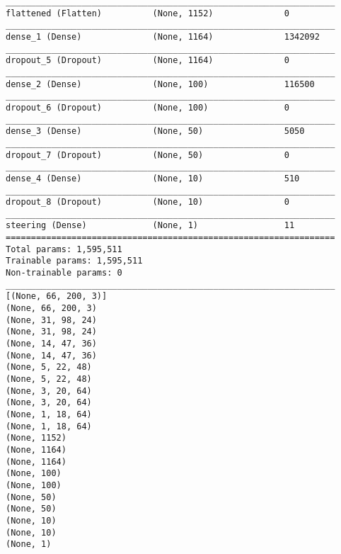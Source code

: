 \begin{verbatim}
_________________________________________________________________
flattened (Flatten)          (None, 1152)              0         
_________________________________________________________________
dense_1 (Dense)              (None, 1164)              1342092   
_________________________________________________________________
dropout_5 (Dropout)          (None, 1164)              0         
_________________________________________________________________
dense_2 (Dense)              (None, 100)               116500    
_________________________________________________________________
dropout_6 (Dropout)          (None, 100)               0         
_________________________________________________________________
dense_3 (Dense)              (None, 50)                5050      
_________________________________________________________________
dropout_7 (Dropout)          (None, 50)                0         
_________________________________________________________________
dense_4 (Dense)              (None, 10)                510       
_________________________________________________________________
dropout_8 (Dropout)          (None, 10)                0         
_________________________________________________________________
steering (Dense)             (None, 1)                 11        
=================================================================
Total params: 1,595,511
Trainable params: 1,595,511
Non-trainable params: 0
_________________________________________________________________
[(None, 66, 200, 3)]
(None, 66, 200, 3)
(None, 31, 98, 24)
(None, 31, 98, 24)
(None, 14, 47, 36)
(None, 14, 47, 36)
(None, 5, 22, 48)
(None, 5, 22, 48)
(None, 3, 20, 64)
(None, 3, 20, 64)
(None, 1, 18, 64)
(None, 1, 18, 64)
(None, 1152)
(None, 1164)
(None, 1164)
(None, 100)
(None, 100)
(None, 50)
(None, 50)
(None, 10)
(None, 10)
(None, 1)
\end{verbatim}

